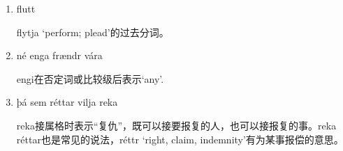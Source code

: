 \begin{grammar*}{}
    \begin{enumerate}[leftmargin=*]
        \item flutt

              flytja `perform; plead'的过去分词。

        \item né enga frændr vára

              engi在否定词或比较级后表示`any'.

        \item þá sem réttar vilja reka

              reka接属格时表示“复仇”，既可以接要报复的人，也可以接报复的事。reka réttar也是常见的说法，réttr `right, claim, indemnity'有为某事报偿的意思。

    \end{enumerate}

\end{grammar*}



